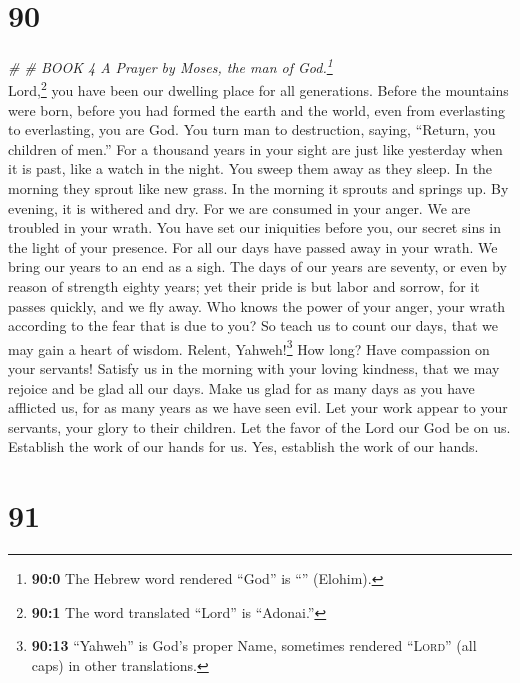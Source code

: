 \hypertarget{section-89}{%
\section{90}\label{section-89}}

\emph{\# \# BOOK 4 A Prayer by Moses, the man of God.\footnote{\textbf{90:0}
  The Hebrew word rendered ``God'' is ``'' (Elohim).}}\\
 Lord,\footnote{\textbf{90:1} The word translated ``Lord''
  is ``Adonai.''} you have been our dwelling place for all generations.
 Before the mountains were born, before you had formed the
earth and the world, even from everlasting to everlasting, you are God.
 You turn man to destruction, saying, ``Return, you
children of men.''  For a thousand years in your sight are
just like yesterday when it is past, like a watch in the night.
 You sweep them away as they sleep. In the morning they
sprout like new grass.  In the morning it sprouts and
springs up. By evening, it is withered and dry.  For we
are consumed in your anger. We are troubled in your wrath.
 You have set our iniquities before you, our secret sins
in the light of your presence.  For all our days have
passed away in your wrath. We bring our years to an end as a sigh.
 The days of our years are seventy, or even by reason of
strength eighty years; yet their pride is but labor and sorrow, for it
passes quickly, and we fly away.  Who knows the power of
your anger, your wrath according to the fear that is due to you?
 So teach us to count our days, that we may gain a heart
of wisdom.  Relent, Yahweh!\footnote{\textbf{90:13}
  ``Yahweh'' is God's proper Name, sometimes rendered ``\textsc{Lord}''
  (all caps) in other translations.} How long? Have compassion on your
servants!  Satisfy us in the morning with your loving
kindness, that we may rejoice and be glad all our days. 
Make us glad for as many days as you have afflicted us, for as many
years as we have seen evil.  Let your work appear to your
servants, your glory to their children.  Let the favor of
the Lord our God be on us. Establish the work of our hands for us. Yes,
establish the work of our hands.

\hypertarget{section-90}{%
\section{91}\label{section-90}}

